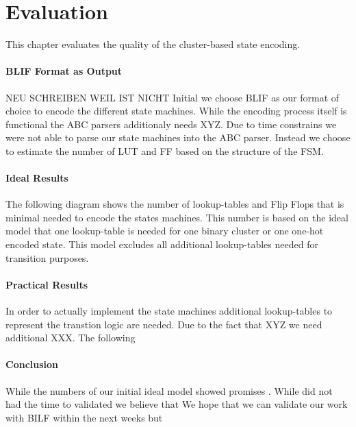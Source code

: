 \chapter{Evaluation}
\label{cha:Evaluation}

This chapter evaluates the quality of the cluster-based state encoding.
\subsubsection{BLIF Format as Output}
\label{subsubsec:BLIFOutput}

NEU SCHREIBEN WEIL IST NICHT
Initial we choose BLIF as our format of choice to encode the different state machines. While the encoding process itself is functional the ABC parsers additionaly needs XYZ.
Due to time constrains we were not able to parse our state machines into the ABC parser. Instead we choose to estimate the number of LUT and FF based on the structure of the FSM.

\subsubsection{Ideal Results}
\label{subsubsec:IResults}

The following diagram shows the number of lookup-tables and Flip Flops that is minimal needed to encode the states machines. This number is based on the ideal model that one lookup-table is needed for one binary cluster or one one-hot encoded state. This model excludes all additional lookup-tables needed for transition purposes.


\subsubsection{Practical Results}
\label{subsubsec:PResults}

In order to actually implement the state machines additional lookup-tables to represent the transtion logic are needed. 
Due to the fact that XYZ we need additional XXX.
The following


\subsubsection{Conclusion}
\label{subsubsec:Conclusion}

While the numbers of our initial ideal model showed promises .
While did not had the time to validated we believe that We hope that we can validate our work with BILF within the next weeks but 



